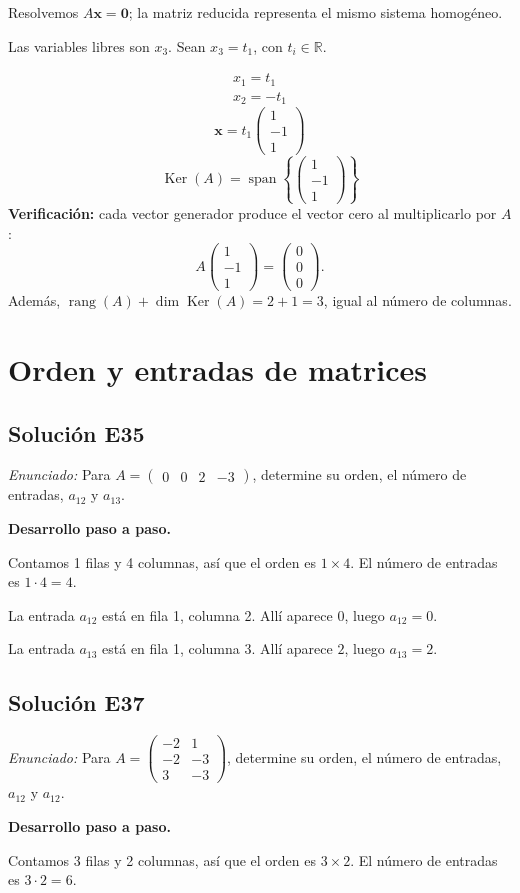 \documentclass[12pt]{article}
\theoremstyle{remark}
\newcommand{\rang}{\operatorname{rang}}
\newcommand{\Ker}{\operatorname{Ker}}
\newcommand{\vect}[1]{\boldsymbol{#1}}
\newcommand{\solucion}[2]{\Needspace{11\baselineskip}\subsection*{Solución E#1}\noindent\textit{Enunciado:} #2\par\medskip\noindent\textbf{Desarrollo paso a paso.}\par\medskip}
\begin{document}
Resolvemos $A\vect x=\vect0$; la matriz reducida representa el mismo sistema homogéneo.

Las variables libres son $x_{3}$. Sean $x_{3}=t_{1}$, con $t_i\in\mathbb R$.

\[
\begin{aligned}x_{1}=t_{1}\\x_{2}=- t_{1}\end{aligned}
\]
\[
\vect x=t_{1}\begin{pmatrix}1\\-1\\1\end{pmatrix}
\]
\[
\boxed{\Ker(A)=\operatorname{span}\left\{\begin{pmatrix}1\\-1\\1\end{pmatrix}\right\}}
\]
\textbf{Verificación:} cada vector generador produce el vector cero al multiplicarlo por $A$:
\[
A\begin{pmatrix}1\\-1\\1\end{pmatrix}=\begin{pmatrix}0\\0\\0\end{pmatrix}.
\]
Además, $\rang(A)+\dim\Ker(A)=2+1=3$, igual al número de columnas.


\medskip

\section{Orden y entradas de matrices}

\solucion{35}{Para $A=\begin{pmatrix}0&0&2&-3\end{pmatrix}$, determine su orden, el número de entradas, $a_{12}$ y $a_{13}$.}
Contamos 1 filas y 4 columnas, así que el orden es $1\times4$. El número de entradas es $1\cdot 4=4$.

La entrada $a_{12}$ está en fila 1, columna 2. Allí aparece $0$, luego $\boxed{a_{12}=0}$.

La entrada $a_{13}$ está en fila 1, columna 3. Allí aparece $2$, luego $\boxed{a_{13}=2}$.


\medskip

\solucion{37}{Para $A=\begin{pmatrix}-2&1\\-2&-3\\3&-3\end{pmatrix}$, determine su orden, el número de entradas, $a_{12}$ y $a_{12}$.}
Contamos 3 filas y 2 columnas, así que el orden es $3\times2$. El número de entradas es $3\cdot 2=6$.
\end{document}
